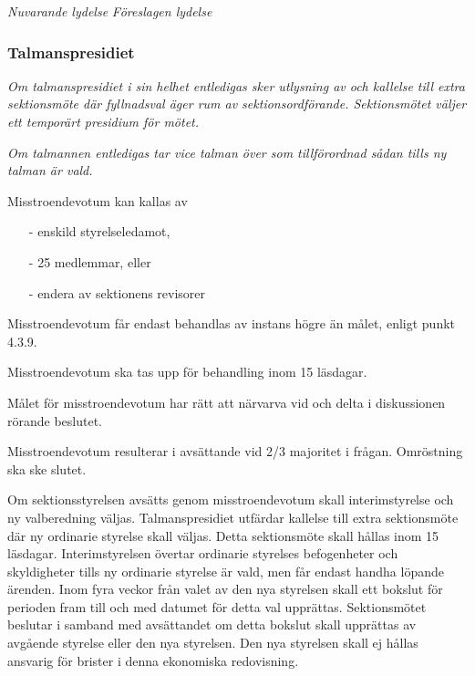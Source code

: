 \documentclass{article}
\newenvironment{lydelse}
    {\begin{paracol}{2}%
        \emph{Nuvarande lydelse}%
        \switchcolumn%
        \emph{Föreslagen lydelse}%
    \end{paracol}%
    \begin{enumerate}[label=\thesubsection.\arabic*]%
    \begin{paracol}{2}%
    }{\end{paracol}\end{enumerate}}
\begin{document}
\begin{lydelse}
    \subsubsection*{Talmanspresidiet}
    \item \emph{Om talmanspresidiet i sin helhet entledigas sker utlysning av och kallelse till extra sektionsmöte där fyllnadsval äger rum av sektionsordförande.
    Sektionsmötet väljer ett temporärt presidium för mötet.}

    \item \emph{Om talmannen entledigas tar vice talman över som tillförordnad sådan tills ny talman är vald.}
     

  \switchcolumn*
    \setcounter{subsection}{3}
    \item Misstroendevotum kan kallas av
	  \begin{itemize}
		\item[-] enskild styrelseledamot, 
  		\item[-] 25 medlemmar, eller
  		\item[-] endera av sektionens revisorer
  	  \end{itemize}
	
	\item Misstroendevotum får endast behandlas av instans högre än målet, enligt punkt 4.3.9.

  	\item Misstroendevotum ska tas upp för behandling inom 15 läsdagar.

  	\item Målet för misstroendevotum har rätt att närvarva vid och delta i diskussionen rörande beslutet.

  	\item Misstroendevotum resulterar i avsättande vid 2/3 majoritet i frågan. Omröstning ska ske slutet. 

  	\item Om sektionsstyrelsen avsätts genom misstroendevotum skall interimstyrelse och ny valberedning väljas. Talmanspresidiet utfärdar kallelse till extra sektionsmöte där ny ordinarie styrelse skall väljas. Detta sektionsmöte skall hållas inom 15 läsdagar. Interimstyrelsen övertar ordinarie styrelses befogenheter och skyldigheter tills ny ordinarie styrelse är vald, men får endast handha löpande ärenden. Inom fyra veckor från valet av den nya styrelsen skall ett bokslut för perioden fram till och med datumet för detta val upprättas. Sektionsmötet beslutar i samband med avsättandet om detta bokslut skall upprättas av avgående styrelse eller den nya styrelsen. Den nya styrelsen skall ej hållas ansvarig för brister i denna ekonomiska redovisning.


\end{lydelse}
\end{document}

